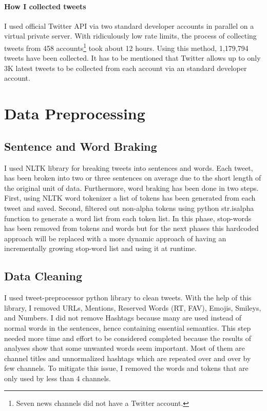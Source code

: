 \documentclass[11pt]{article}
\begin{document}
\paragraph{How I collected tweets}
I used official Twitter API via two standard developer accounts in parallel on a virtual private server. With ridiculously low rate limits, the process of collecting tweets from 458 accounts\footnote{Seven news channels did not have a Twitter account.} took about 12 hours. Using this method, 1,179,794 tweets have been collected. It has to be mentioned that Twitter allows up to only 3K latest tweets to be collected from each account via an standard developer account.

\section{Data Preprocessing}

\subsection{Sentence and Word Braking}
I used NLTK library for breaking tweets into sentences and words. Each tweet, has been broken into two or three sentences on average due to the short length of the original unit of data. Furthermore, word braking has been done in two steps. First, using NLTK word tokenizer a list of tokens has been generated from each tweet and saved. Second, filtered out non-alpha tokens using python str.isalpha function to generate a word list from each token list.
In this phase, stop-words has been removed from tokens and words but for the next phases this hardcoded approach will be replaced with a more dynamic approach of having an incrementally growing stop-word list and using it at runtime.

\subsection{Data Cleaning}
I used tweet-preprocessor python library to clean tweets. With the help of this library, I removed URLs, Mentions, Reserved Words (RT, FAV), Emojis, Smileys, and Numbers. I did not remove Hashtags because many are used instead of normal words in the sentences, hence containing essential semantics. This step needed more time and effort to be considered completed because the results of analyses show that some unwanted words seem important. Most of them are channel titles and unnormalized hashtags which are repeated over and over by few channels. To mitigate this issue, I removed the words and tokens that are only used by less than 4 channels.
\end{document}
